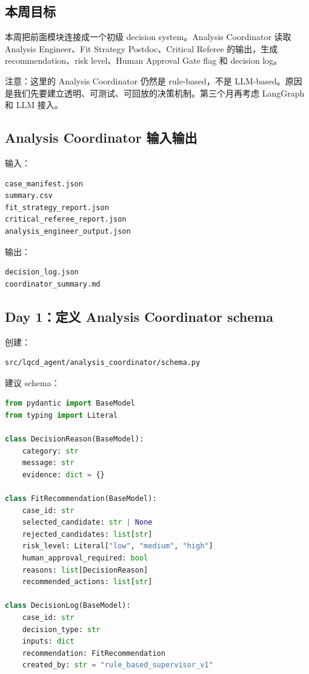 \documentclass[11pt,a4paper,fontset=none]{ctexart}
\begin{document}
\subsection{本周目标}

本周把前面模块连接成一个初级 decision system。Analysis Coordinator 读取 Analysis Engineer、Fit Strategy Postdoc、Critical Referee 的输出，生成 recommendation、risk level、Human Approval Gate flag 和 decision log。

注意：这里的 Analysis Coordinator 仍然是 rule-based，不是 LLM-based。原因是我们先要建立透明、可测试、可回放的决策机制。第三个月再考虑 LangGraph 和 LLM 接入。

\subsection{Analysis Coordinator 输入输出}

输入：

\begin{lstlisting}
case_manifest.json
summary.csv
fit_strategy_report.json
critical_referee_report.json
analysis_engineer_output.json
\end{lstlisting}

输出：

\begin{lstlisting}
decision_log.json
coordinator_summary.md
\end{lstlisting}

\subsection{Day 1：定义 Analysis Coordinator schema}

创建：

\begin{lstlisting}
src/lqcd_agent/analysis_coordinator/schema.py
\end{lstlisting}

建议 schema：

\begin{lstlisting}[language=Python]
from pydantic import BaseModel
from typing import Literal

class DecisionReason(BaseModel):
    category: str
    message: str
    evidence: dict = {}

class FitRecommendation(BaseModel):
    case_id: str
    selected_candidate: str | None
    rejected_candidates: list[str]
    risk_level: Literal["low", "medium", "high"]
    human_approval_required: bool
    reasons: list[DecisionReason]
    recommended_actions: list[str]

class DecisionLog(BaseModel):
    case_id: str
    decision_type: str
    inputs: dict
    recommendation: FitRecommendation
    created_by: str = "rule_based_supervisor_v1"
\end{lstlisting}
\end{document}

